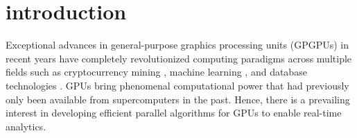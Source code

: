 \section{introduction}
Exceptional advances in general-purpose graphics processing units (GPGPUs) 
in recent years have completely revolutionized computing paradigms across multiple fields such as cryptocurrency mining \cite{o2014bitcoin,taylor2013bitcoin}, machine learning \cite{coates2013deep,abadi2016tensorflow}, and database technologies \cite{bakkum2010accelerating,kaldewey2012gpu}.
GPUs bring phenomenal computational power that had previously only been available from supercomputers in the past. 
Hence, there is a prevailing interest in developing efficient parallel algorithms for GPUs to enable real-time analytics.

